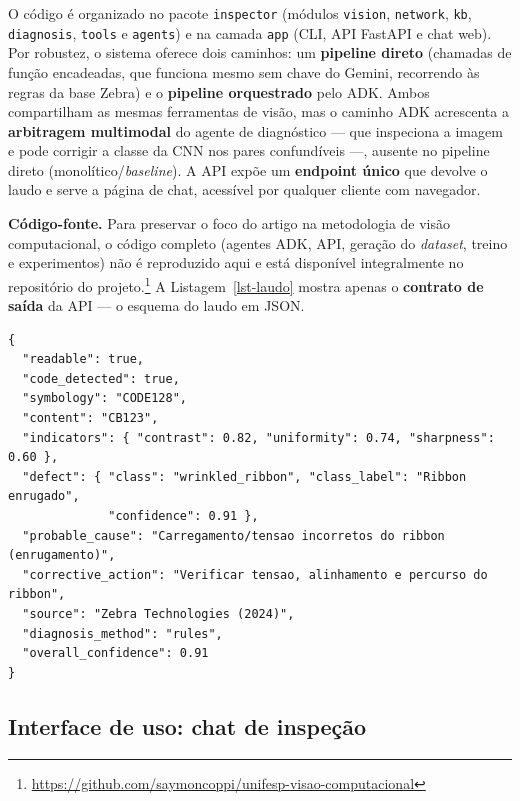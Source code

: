 \documentclass[
	article,			%
	11pt,				%
	oneside,			%
	a4paper,			%
	english,			%
	brazilian,			%
	sumario=tradicional
	]{abntex2}
\begin{document}
O código é organizado no pacote \texttt{inspector} (módulos \texttt{vision},
\texttt{network}, \texttt{kb}, \texttt{diagnosis}, \texttt{tools} e
\texttt{agents}) e na camada \texttt{app} (CLI, API FastAPI e chat web). Por
robustez, o sistema oferece dois caminhos: um \textbf{pipeline direto} (chamadas de
função encadeadas, que funciona mesmo sem chave do Gemini, recorrendo às regras da
base Zebra) e o \textbf{pipeline orquestrado} pelo ADK. Ambos compartilham as mesmas
ferramentas de visão, mas o caminho ADK acrescenta a \textbf{arbitragem multimodal}
do agente de diagnóstico --- que inspeciona a imagem e pode corrigir a classe da CNN
nos pares confundíveis ---, ausente no pipeline direto (monolítico/\textit{baseline}).
A API expõe um \textbf{endpoint único} que devolve o laudo e serve a página de chat,
acessível por qualquer cliente com navegador.

\noindent\textbf{Código-fonte.} Para preservar o foco do artigo na metodologia de
visão computacional, o código completo (agentes ADK, API, geração do
\textit{dataset}, treino e experimentos) não é reproduzido aqui e está disponível
integralmente no repositório do projeto.\footnote{\url{https://github.com/saymoncoppi/unifesp-visao-computacional}}
A Listagem~\ref{lst-laudo} mostra apenas o \textbf{contrato de saída} da API --- o
esquema do laudo em JSON.

\begin{lstlisting}[language={},caption={Esquema do laudo devolvido pela API (JSON)},label=lst-laudo]
{
  "readable": true,
  "code_detected": true,
  "symbology": "CODE128",
  "content": "CB123",
  "indicators": { "contrast": 0.82, "uniformity": 0.74, "sharpness": 0.60 },
  "defect": { "class": "wrinkled_ribbon", "class_label": "Ribbon enrugado",
              "confidence": 0.91 },
  "probable_cause": "Carregamento/tensao incorretos do ribbon (enrugamento)",
  "corrective_action": "Verificar tensao, alinhamento e percurso do ribbon",
  "source": "Zebra Technologies (2024)",
  "diagnosis_method": "rules",
  "overall_confidence": 0.91
}
\end{lstlisting}

\subsection{Interface de uso: chat de inspeção}
\end{document}
